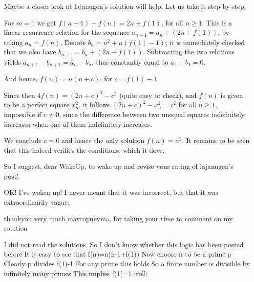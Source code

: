 \begin{solution}
	Maybe a closer look at lajanugen's solution will help. Let us take it step-by-step.

For $m=1$ we get $f(n+1)-f(n)=2n+f(1)$, for all $n\geq 1$. This is a linear recurrence relation for the sequence $a_{n+1} = a_n + (2n+f(1))$, by taking $a_n = f(n)$. Denote $b_n = n^2 +n(f(1)-1)$; it is immediately checked that we also have $b_{n+1} = b_n + (2n + f(1))$. Subtracting the two relations yields $a_{n+1} - b_{n+1} = a_{n} - b_{n}$, thus constantly equal to $a_1 - b_1 = 0$.

And hence, $f(n)=n(n+c)$, for $c=f(1)-1$.

Since then $4f(n)=(2n+c)^2-c^2$ (quite easy to check), and $f(n)$ is given to be a perfect square $x_n^2$, it follows $(2n+c)^2 - x_n^2 = c^2$ for all $n\geq 1$, impossible if $c\neq 0$, since the difference between two unequal squares indefinitely increases when one of them indefinitely increases.

We conclude $c=0$ and hence the only solution $f(n)=n^2$. It remains to be seen that this indeed verifies the conditions, which it does.

So I suggest, dear WakeUp, to wake up and revise your rating of lajanugen's post!
\end{solution}



\begin{solution}
	OK! I've woken up! I never meant that it was incorrect, but that it was extraordinarily vague.
\end{solution}



\begin{solution}
	thankyou very much mavropnevma, for taking your time to comment on my solution
\end{solution}



\begin{solution}
	I did not read the solutions.
So I don't know whether this logic has been posted before
It is easy to see that
f(n)=n(n-1+f(1))
Now choose n to be a prime p
Clearly p divides f(1)-1
For any prime this holds
So a finite number is divisible by infinitely many primes
This implies f(1)=1 :roll:
\end{solution}



